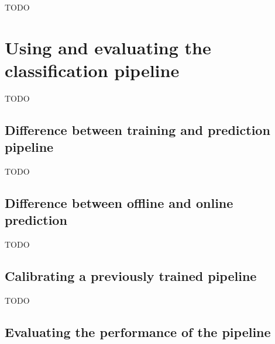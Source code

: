 TODO

\section{Using and evaluating the classification pipeline}
\label{sec:processing_signals_evaluating_and_using}



TODO


\subsection{Difference between training and prediction pipeline}
\label{subsec:processing_signals_evaluating_and_using_training_vs_prediction}

TODO


\subsection{Difference between offline and online prediction}
\label{subsec:processing_signals_evaluating_and_using_offline_vs_online}

TODO


\subsection{Calibrating a previously trained pipeline}
\label{subsec:processing_signals_evaluating_and_using_calibration}

TODO


\subsection{Evaluating the performance of the pipeline}
\label{subsec:processing_signals_evaluating_and_using_evaluation}


